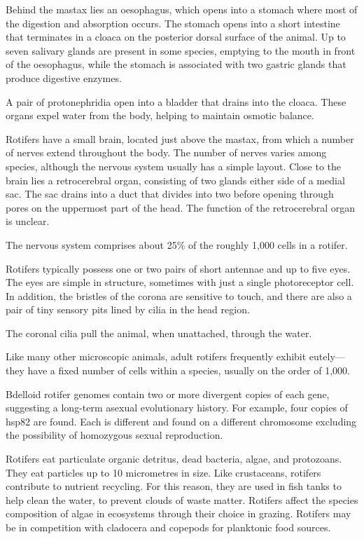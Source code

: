 Behind the mastax lies an oesophagus, which opens into a stomach where most of the digestion and absorption occurs. The stomach opens into a short intestine that terminates in a cloaca on the posterior dorsal surface of the animal. Up to seven salivary glands are present in some species, emptying to the mouth in front of the oesophagus, while the stomach is associated with two gastric glands that produce digestive enzymes.

A pair of protonephridia open into a bladder that drains into the cloaca. These organs expel water from the body, helping to maintain osmotic balance.

Rotifers have a small brain, located just above the mastax, from which a number of nerves extend throughout the body. The number of nerves varies among species, although the nervous system usually has a simple layout. Close to the brain lies a retrocerebral organ, consisting of two glands either side of a medial sac. The sac drains into a duct that divides into two before opening through pores on the uppermost part of the head. The function of the retrocerebral organ is unclear.

The nervous system comprises about 25\% of the roughly 1,000 cells in a rotifer.

Rotifers typically possess one or two pairs of short antennae and up to five eyes. The eyes are simple in structure, sometimes with just a single photoreceptor cell. In addition, the bristles of the corona are sensitive to touch, and there are also a pair of tiny sensory pits lined by cilia in the head region.

The coronal cilia pull the animal, when unattached, through the water.

Like many other microscopic animals, adult rotifers frequently exhibit eutely---they have a fixed number of cells within a species, usually on the order of 1,000.

Bdelloid rotifer genomes contain two or more divergent copies of each gene, suggesting a long-term asexual evolutionary history. For example, four copies of hsp82 are found. Each is different and found on a different chromosome excluding the possibility of homozygous sexual reproduction.

Rotifers eat particulate organic detritus, dead bacteria, algae, and protozoans. They eat particles up to 10 micrometres in size. Like crustaceans, rotifers contribute to nutrient recycling. For this reason, they are used in fish tanks to help clean the water, to prevent clouds of waste matter. Rotifers affect the species composition of algae in ecosystems through their choice in grazing. Rotifers may be in competition with cladocera and copepods for planktonic food sources.

